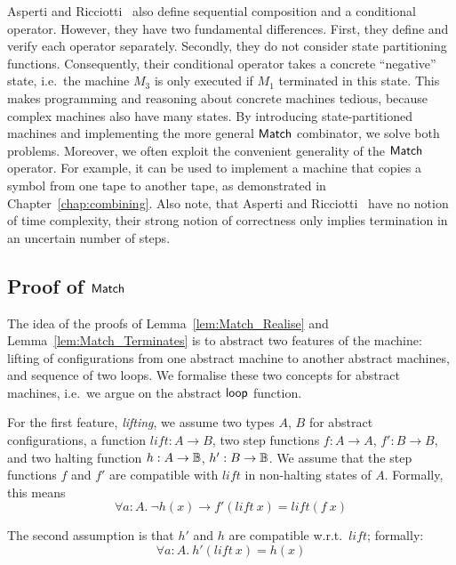 Asperti and Ricciotti~\cite{asperti2015} also define sequential composition and a conditional operator.  However, they have two fundamental
differences.  First, they define and verify each operator separately.  Secondly, they do not consider state partitioning functions.  Consequently,
their conditional operator takes a concrete ``negative'' state, i.e.\ the machine $M_3$ is only executed if $M_1$ terminated in this state.  This
makes programming and reasoning about concrete machines tedious, because complex machines also have many states.  By introducing state-partitioned
machines and implementing the more general $\mathsf{Match}$ combinator, we solve both problems.  Moreover, we often exploit the convenient generality of the
$\mathsf{Match}$ operator.  For example, it can be used to implement a machine that copies a symbol from one tape to another tape, as demonstrated in
Chapter~\ref{chap:combining}.  Also note, that Asperti and Ricciotti~\cite{asperti2015} have no notion of time complexity, their strong notion of
correctness only implies termination in an uncertain number of steps.


\subsection{Proof of $\mathsf{Match}$}
\label{sec:match-proofs}


The idea of the proofs of Lemma~\ref{lem:Match_Realise} and Lemma~\ref{lem:Match_Terminates} is to abstract two features of the machine: lifting of
configurations from one abstract machine to another abstract machines, and sequence of two loops.  We formalise these two concepts for abstract
machines, i.e.\ we argue on the abstract $\mathsf{loop}$ function.

For the first feature, \textit{lifting}, we assume two types $A$, $B$ for abstract configurations, a function $lift : A \to B$, two step functions
$f : A \to A$, $f' : B \to B$, and two halting function $h : A \rightarrow \mathbb{B}$, $h' : B \rightarrow \mathbb{B}$.  We assume that the step functions $f$ and $f'$ are
compatible with $lift$ in non-halting states of $A$.  Formally, this means
\begin{equation}
  \label{eq:loop_lift_assumption1}
  \forall a:A.~\lnot h(x) \rightarrow f' (lift~x) = lift (f~x)
\end{equation}

The second assumption is that $h'$ and $h$ are compatible w.r.t.\ $lift$; formally:
\begin{equation}
  \label{eq:loop_lift_assumption2}
  \forall a:A.~h'(lift~x)=h(x)
\end{equation}

